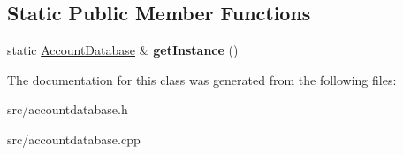 \subsection*{Static Public Member Functions}
\begin{DoxyCompactItemize}
\item 
\mbox{\label{classAccountDatabase_acd79aa3e28423ea3016e9428014167d0}} 
static \hyperlink{classAccountDatabase}{Account\+Database} \& {\bfseries get\+Instance} ()
\end{DoxyCompactItemize}


The documentation for this class was generated from the following files\+:\begin{DoxyCompactItemize}
\item 
src/accountdatabase.\+h\item 
src/accountdatabase.\+cpp\end{DoxyCompactItemize}
